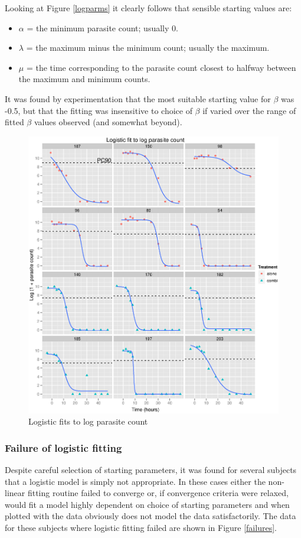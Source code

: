 Looking at Figure \ref{logparms} it clearly follows that sensible starting values are:
\begin{itemize}
\item $\alpha$ = the minimum parasite count; usually 0.
\item $\lambda$ = the maximum minus the minimum count; usually the maximum.
\item $\mu$ = the time corresponding to the parasite count closest to halfway between the maximum and minimum counts.
\end{itemize} 
It was found by experimentation that the most suitable starting value for $\beta$ was -0.5, but that the fitting was insensitive to choice of $\beta$ if varied over the range of fitted $\beta$ values observed (and somewhat beyond).
\begin{figure}[p]
\includegraphics[width=6.1in]{logistics.eps} 
\caption{Logistic fits to log parasite count}\label{logistics}
\end{figure}
\subsubsection*{Failure of logistic fitting}
Despite careful selection of starting parameters, it was found for several subjects that a logistic model is simply not appropriate. In these cases either the non-linear fitting routine failed to converge or, if convergence criteria were relaxed, would fit a model highly dependent on choice of starting parameters and when plotted with the data obviously does not model the data satisfactorily. The data for these subjects where logistic fitting failed are shown in Figure \ref{failures}.

